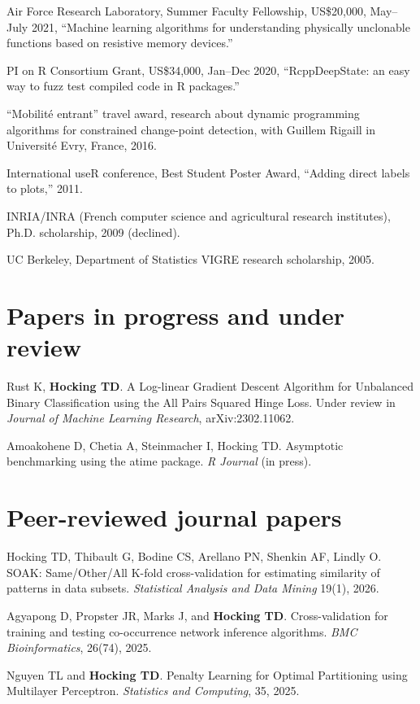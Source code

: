 \documentclass[margin,line]{res}
\begin{document}
\begin{resume}
Air Force Research Laboratory, Summer Faculty Fellowship, US\$20,000,
May--July 2021, ``Machine learning algorithms for understanding
physically unclonable functions based on resistive memory devices.''

PI on R Consortium Grant, US\$34,000, Jan--Dec 2020, ``RcppDeepState: an easy
way to fuzz test compiled code in R packages.''

``Mobilit\'e entrant'' travel award, research about dynamic
programming algorithms for constrained change-point detection, with
Guillem Rigaill in Universit\'e Evry, France, 2016.

International useR conference, Best Student Poster Award, ``Adding
direct labels to plots,'' 2011.

INRIA/INRA (French computer science and agricultural research institutes), Ph.D. scholarship, 2009 (declined).

UC Berkeley, Department of Statistics VIGRE research scholarship, 2005.

\section{\sc Papers in progress and under review}

Rust K, {\bf Hocking TD}. A Log-linear Gradient Descent Algorithm for
Unbalanced Binary Classification using the All Pairs Squared Hinge
Loss. Under review in {\it Journal of Machine Learning Research},
arXiv:2302.11062.

Amoakohene D, Chetia A, Steinmacher I, Hocking TD.
Asymptotic benchmarking using the atime package.
{\it R Journal} (in press).

\section{\sc Peer-reviewed journal papers}

Hocking TD, Thibault G, Bodine CS, Arellano PN, Shenkin AF, Lindly O.
SOAK: Same/Other/All K-fold cross-validation for estimating similarity of patterns in data subsets.
{\it Statistical Analysis and Data Mining} 19(1), 2026.

Agyapong D, Propster JR, Marks J, and {\bf Hocking TD}. Cross-validation for training and testing co-occurrence network inference algorithms. {\it BMC Bioinformatics}, 26(74), 2025.

Nguyen TL and {\bf Hocking TD}. Penalty Learning for Optimal Partitioning using Multilayer Perceptron. {\it Statistics and Computing}, 35, 2025.


\end{resume}
\end{document}
